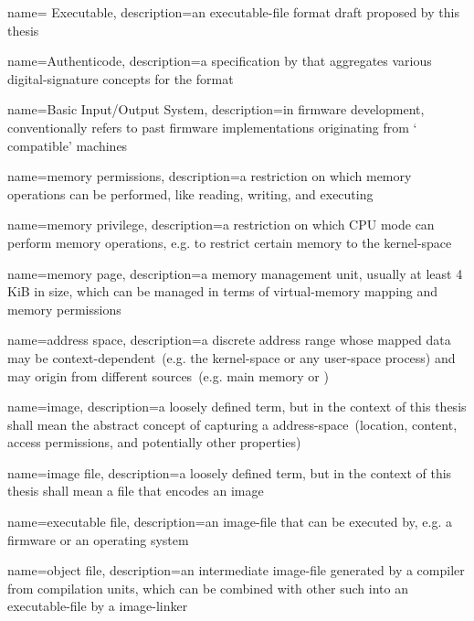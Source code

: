 {
  name={ Executable},
  description={an \gls{executable-file} format draft proposed by this thesis}
}

{
  name={Authenticode},
  description={a specification by  that aggregates various \gls{digital-signature} concepts for the  format}
}

{
  name={Basic Input/Output System},
  description={in \gls{firmware} development, conventionally refers to past \gls{firmware} implementations originating from `  compatible' machines}
}

{
  name={memory permissions},
  description={a restriction on which memory operations can be performed, like reading, writing, and executing}
}

{
  name={memory privilege},
  description={a restriction on which \gls{CPU} mode can perform memory operations, e.g. to restrict certain memory to the \gls{kernel-space}}
}

{
  name={memory page},
  description={a memory management unit, usually at least 4 KiB in size, which can be managed in terms of \gls{virtual-memory} mapping and memory permissions}
}

{
  name={address space},
  description={a discrete address range whose mapped data may be context-dependent~(e.g. the \gls{kernel-space} or any \gls{user-space} process) and may origin from different sources~(e.g. main memory or )}
}

{
  name={image},
  description={a loosely defined term, but in the context of this thesis shall mean the abstract concept of capturing a \gls{address-space}~(location, content, access permissions, and potentially other properties)}
}

{
  name={\gls{image} file},
  description={a loosely defined term, but in the context of this thesis shall mean a file that encodes an \gls{image}}
}

{
  name={executable file},
  description={an \gls{image-file} that can be executed by, e.g. a \gls{firmware} or an operating system}
}

{
  name={object file},
  description={an intermediate \gls{image-file} generated by a compiler from compilation units, which can be combined with other such into an \gls{executable-file} by a \gls{image-linker}}
}

